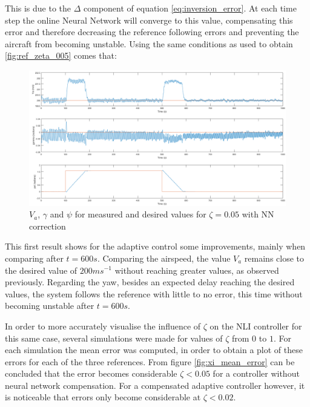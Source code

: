This is due to the $\Delta$ component of equation \ref{eq:inversion_error}. At each time step the online Neural Network will converge to this value, compensating this error and therefore decreasing the reference following errors and preventing the aircraft from becoming unstable. Using the same conditions as used to obtain \ref{fig:ref_zeta_005} comes that:

\begin{figure}[H]
\centering
\includegraphics[width=1.1\textwidth]{Figures/Results/ref_zeta_005_NN.png}
\caption[Reference tracking for $\zeta=0.05$ with NN correction]{$V_a$, $\gamma$ and $\psi$ for measured and desired values for $\zeta=0.05$ with NN correction}
\label{fig:ref_zeta_005_NN}
\end{figure}

This first result shows for the adaptive control some improvements, mainly when comparing after $t=600s$. Comparing the airspeed, the value $V_a$ remains close to the desired value of $200ms^{-1}$ without reaching greater values, as observed previously. Regarding the yaw, besides an expected delay reaching the desired values, the system follows the reference with little to no error, this time without becoming unstable after $t=600s$. 

In order to more accurately visualise the influence of $\zeta$ on the NLI controller for this same case, several simulations were made for values of $\zeta$ from $0$ to $1$. For each simulation the mean error was computed, in order to obtain a plot of these errors for each of the three references. From figure  \ref{fig:xi_mean_error} can be concluded that the error becomes considerable $\zeta<0.05$ for a controller without neural network compensation. For a compensated adaptive controller however, it is noticeable that errors only become considerable at $\zeta<0.02$.


